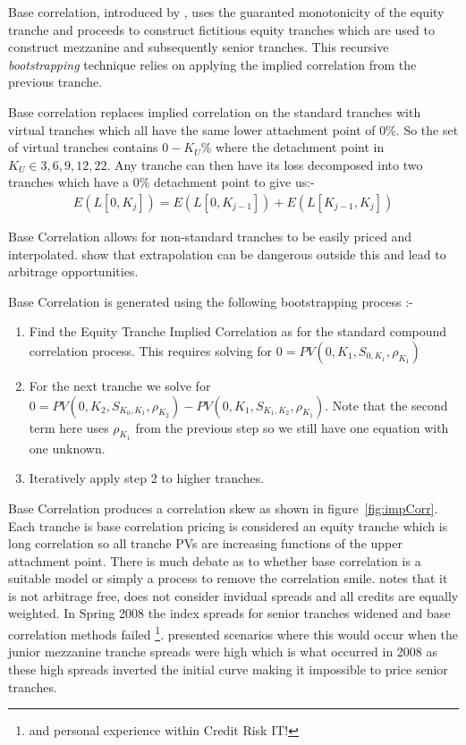 Base correlation, introduced by \cite{MA2004}, uses the guaranted monotonicity of the equity tranche and proceeds to construct fictitious equity tranches which are used to construct mezzanine and subsequently senior tranches. This recursive { \em bootstrapping } technique relies on applying the implied correlation from the previous tranche.

Base correlation replaces implied correlation on the standard tranches with virtual tranches which all have the same lower attachment point of 0\%. So the set of virtual tranches contains $0 - K_U\%$ where the detachment point in $K_U \in { 3,6,9,12,22 }$. Any tranche can then have its loss decomposed into two tranches which have a $0\%$ detachment point to give us:-
\begin{align}
E(L[0,K_j])=E(L[0,K_{j-1}]) + E(L[K_{j-1},K_{j}])
\end{align}

Base Correlation allows for non-standard tranches to be easily priced and interpolated.
\cite{pw2007} show that extrapolation can be dangerous outside this and lead to arbitrage opportunities. 

Base Correlation is generated using the following bootstrapping process \cite{KL2004}:-
\begin{enumerate}
\item	Find the Equity Tranche Implied Correlation as for the standard compound correlation process. This requires solving for $0 = PV(0,K_1,S_{0,K_1},\rho_{K_1})$	
\item	For the next tranche we solve for $0 = PV(0,K_2,S_{K_0,K_1},\rho_{K_2}) - PV(0,K_1,S_{K_1,K_2},\rho_{K_1})$.  Note that the second term here uses $\rho_{K_1}$ from the previous step so we still have one equation with one unknown.	
\item	Iteratively apply step 2 to higher tranches.
\end{enumerate}

Base Correlation produces a correlation skew as shown in figure~\ref{fig:impCorr}. Each tranche is base correlation pricing is considered an equity tranche which is long correlation so all tranche PVs are increasing functions of the upper attachment point.
There is much debate as to whether base correlation is a suitable model or simply a process to remove the correlation smile. \cite{risk2006} notes that it is not arbitrage free, does not consider invidual spreads and all credits are equally weighted. In Spring 2008 the index spreads for senior tranches widened and base correlation methods failed \cite{kre2008}\footnote{and personal experience within Credit Risk IT!}. \cite{KL2004} presented scenarios where this would occur when the junior mezzanine tranche spreads were high which is what occurred in 2008 as these high spreads inverted the initial curve making it impossible to price senior tranches.




